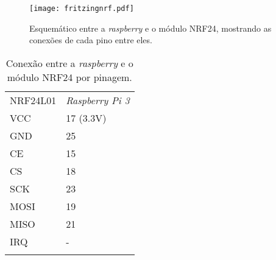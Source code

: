     \begin{figure}[H]
    \centering
    \texttt{[image: fritzingnrf.pdf]}
    \caption{Esquemático entre a \emph{raspberry} e o módulo NRF24, mostrando as conexões de cada pino entre eles.}
    \label{fritizingnrf}
\end{figure}

    
  \begin{table}[h]
 \centering
 {\renewcommand\arraystretch{1.25}
 \caption{Conexão entre a \emph{raspberry} e o módulo NRF24 por pinagem.}
 \begin{tabular}{ l l }
  \cline{1-1}\cline{2-2}  
    \multicolumn{1}{|p{3.850cm}|}{NRF24L01 \centering } &
    \multicolumn{1}{p{4.217cm}|}{\emph{Raspberry Pi 3} \centering }
  \\  
  \cline{1-1}\cline{2-2}  
    \multicolumn{1}{|p{3.850cm}|}{VCC \centering } &
    \multicolumn{1}{p{4.217cm}|}{17 (3.3V) \centering }
  \\  
  \cline{1-1}\cline{2-2}  
    \multicolumn{1}{|p{3.850cm}|}{GND \centering } &
    \multicolumn{1}{p{4.217cm}|}{25  \centering }
  \\  
  \cline{1-1}\cline{2-2}  
    \multicolumn{1}{|p{3.850cm}|}{CE \centering } &
    \multicolumn{1}{p{4.217cm}|}{15 \centering }
  \\  
  \cline{1-1}\cline{2-2}  
    \multicolumn{1}{|p{3.850cm}|}{CS \centering } &
    \multicolumn{1}{p{4.217cm}|}{18 \centering }
  \\  
  \cline{1-1}\cline{2-2}  
    \multicolumn{1}{|p{3.850cm}|}{SCK \centering } &
    \multicolumn{1}{p{4.217cm}|}{23 \centering }
  \\  
  \cline{1-1}\cline{2-2}  
    \multicolumn{1}{|p{3.850cm}|}{MOSI \centering } &
    \multicolumn{1}{p{4.217cm}|}{19 \centering }
  \\  
  \cline{1-1}\cline{2-2}  
    \multicolumn{1}{|p{3.850cm}|}{MISO \centering } &
    \multicolumn{1}{p{4.217cm}|}{21 \centering }
  \\  
  \cline{1-1}\cline{2-2}  
    \multicolumn{1}{|p{3.850cm}|}{IRQ \centering } &
    \multicolumn{1}{p{4.217cm}|}{- \centering }
  \\  
  \hline
\label{tabelanrf}
 \end{tabular} }
\end{table}  



